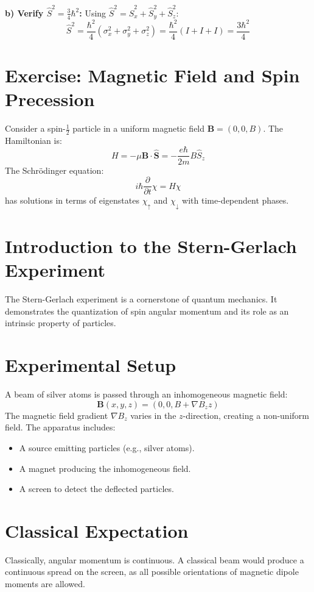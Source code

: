 \documentclass[a4paper,12pt]{article}
\begin{document}
\begin{multicols}{2}
\textbf{b) Verify $\hat{S}^2 = \frac{3}{4} \hbar^2$:}
Using $\hat{S}^2 = \hat{S}_x^2 + \hat{S}_y^2 + \hat{S}_z^2$:
\[
\hat{S}^2 = \frac{\hbar^2}{4} (\sigma_x^2 + \sigma_y^2 + \sigma_z^2) = \frac{\hbar^2}{4}(I + I + I) = \frac{3\hbar^2}{4}
\]

\section*{Exercise: Magnetic Field and Spin Precession}
Consider a spin-$\frac{1}{2}$ particle in a uniform magnetic field $\mathbf{B} = (0, 0, B)$. The Hamiltonian is:
\[
H = -\mu \mathbf{B} \cdot \hat{\mathbf{S}} = -\frac{e \hbar}{2m} B \hat{S}_z
\]
The Schrödinger equation:
\[
i\hbar \frac{\partial}{\partial t} \chi = H \chi
\]
has solutions in terms of eigenstates $\chi_\uparrow$ and $\chi_\downarrow$ with time-dependent phases.

\section*{Introduction to the Stern-Gerlach Experiment}
The Stern-Gerlach experiment is a cornerstone of quantum mechanics. It demonstrates the quantization of spin angular momentum and its role as an intrinsic property of particles.

\section*{Experimental Setup}
A beam of silver atoms is passed through an inhomogeneous magnetic field:
\[
\mathbf{B}(x, y, z) = (0, 0, B + \nabla B_z z)
\]
The magnetic field gradient $\nabla B_z$ varies in the $z$-direction, creating a non-uniform field. The apparatus includes:
\begin{itemize}
    \item A source emitting particles (e.g., silver atoms).
    \item A magnet producing the inhomogeneous field.
    \item A screen to detect the deflected particles.
\end{itemize}

\section*{Classical Expectation}
Classically, angular momentum is continuous. A classical beam would produce a continuous spread on the screen, as all possible orientations of magnetic dipole moments are allowed.


\end{multicols}
\end{document}
